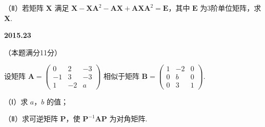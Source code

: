 \documentclass[UTF8,12pt,fontset=windows]{ctexart}
\begin{document}
（Ⅱ）若矩阵 $\boldsymbol{X}$ 满足 $\boldsymbol{X} - \boldsymbol{XA}^2 - \boldsymbol{AX} + \boldsymbol{AXA}^2 = \boldsymbol{E}$，其中 $\boldsymbol{E}$ 为3阶单位矩阵，求 $\boldsymbol{X}$.

\vfill
\newpage
{\large\bfseries 2015.23}

（本题满分11分）

设矩阵 $\boldsymbol{A} = \begin{pmatrix} 0 & 2 & -3 \\ -1 & 3 & -3 \\ 1 & -2 & a \end{pmatrix}$ 相似于矩阵 $\boldsymbol{B} = \begin{pmatrix} 1 & -2 & 0 \\ 0 & b & 0 \\ 0 & 3 & 1 \end{pmatrix}$.

（Ⅰ）求 $a$，$b$ 的值；

（Ⅱ）求可逆矩阵 $\boldsymbol{P}$，使 $\boldsymbol{P}^{-1}\boldsymbol{AP}$ 为对角矩阵.

\vfill
\end{document}
